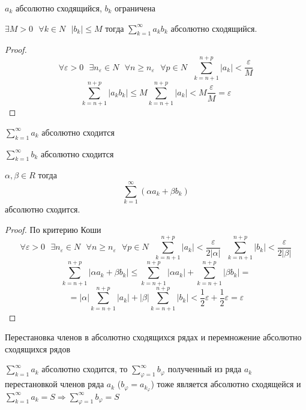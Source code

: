 \begin{theorem}
  $a_k$ абсолютно сходящийся, $b_k$ ограничена

  $\exists M > 0 ~~~ \forall k \in N ~~~ |b_k| \le M$ тогда
  $\sum_{k=1}^{\infty} a_k b_k$ абсолютно сходящийся.
\end{theorem}

\begin{proof}
  $$
  \forall \varepsilon > 0 ~~~ \exists n_{\varepsilon} \in N ~~~
  \forall n \ge n_{\varepsilon} ~~~ \forall p \in N ~~~
  \sum_{k=n+1}^{n+p} |a_k| < \frac{\varepsilon}{M}
  $$
  $$
  \sum_{k=n+1}^{n+p} |a_k b_k| \le
  M \sum_{k=n+1}^{n+p} |a_k| < M \frac{\varepsilon}{M} = \varepsilon
  $$
\end{proof}

\begin{theorem}
  $\sum_{k=1}^{\infty} a_k$ абсолютно сходится

  $\sum_{k=1}^{\infty} b_k$ абсолютно сходится

  $\alpha, \beta \in R$ тогда
  $$
  \sum_{k=1}^{\infty} ( \alpha a_k + \beta b_k )
  $$
  абсолютно сходится.
\end{theorem}

\begin{proof}
  По критерию Коши
  $$
  \forall \varepsilon > 0 ~~~ \exists n_{\varepsilon} \in N ~~~
  \forall n \ge n_{\varepsilon} ~~~ \forall p \in N ~~~
  \sum_{k=n+1}^{n+p} |a_k| < \frac{\varepsilon}{2|\alpha|} ~~~
  \sum_{k=n+1}^{n+p} |b_k| < \frac{\varepsilon}{2|\beta|}
  $$
  $$
  \sum_{k=n+1}^{n+p} |\alpha a_k + \beta b_k| \le
  \sum_{k=n+1}^{n+p} |\alpha a_k| + \sum_{k=n+1}^{n+p} |\beta b_k| =
  $$
  $$
  = |\alpha| \sum_{k=n+1}^{n+p} |a_k| + |\beta| \sum_{k=n+1}^{n+p} |b_k| <
  \frac{1}{2} \varepsilon + \frac{1}{2} \varepsilon = \varepsilon
  $$
\end{proof}

\begin{title}[\Large]
  Перестановка членов в абсолютно сходящихся рядах и перемножение абсолютно
  сходящихся рядов
\end{title}

\begin{theorem}
  $\sum_{k=1}^{\infty} a_k$ абсолютно сходится, то
  $\sum_{\varphi=1}^{\infty} b_{\varphi}$ полученный из ряда $a_k$ перестановкой
  членов ряда $a_k$ ($b_{\varphi} = a_{k_{\varphi}}$) тоже является абсолютно
  сходящейся и $\sum_{k=1}^{\infty} a_k = S \Rightarrow
  \sum_{\varphi=1}^{\infty} b_{\varphi} = S$
\end{theorem}

